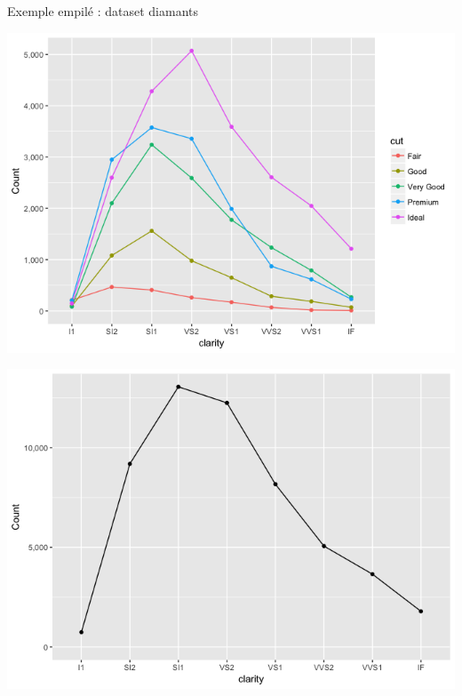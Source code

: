 \documentclass[french]{beamer}
\begin{document}
\begin{frame}{Exemple empilé : dataset diamants}
\begin{minipage}{.45\textwidth}
	\begin{center}
		\includegraphics[width=\textwidth]{diamonds_type}
	\end{center}
\end{minipage}
\hfill
\begin{minipage}{.45\textwidth}
	\begin{center}
		\includegraphics[width=\textwidth]{diamonds_sum}
	\end{center}
\end{minipage}
\end{frame}
\end{document}

